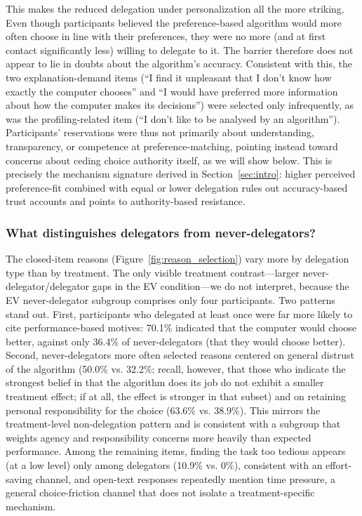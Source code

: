 \documentclass[a4paper, 12pt, fleqn]{article}
\theoremstyle{definition}
\begin{document}
This makes the reduced delegation under personalization all the more striking. Even though participants believed the preference-based algorithm would more often choose in line with their preferences, they were no more (and at first contact significantly less) willing to delegate to it. The barrier therefore does not appear to lie in doubts about the algorithm's accuracy. Consistent with this, the two explanation-demand items (``I find it unpleasant that I don't know how exactly the computer chooses'' and ``I would have preferred more information about how the computer makes its decisions'') were selected only infrequently, as was the profiling-related item (``I don't like to be analysed by an algorithm''). Participants' reservations were thus not primarily about understanding, transparency, or competence at preference-matching, pointing instead toward concerns about ceding choice authority itself, as we will show below. This is precisely the mechanism signature derived in Section~\ref{sec:intro}: higher perceived preference-fit combined with equal or lower delegation rules out accuracy-based trust accounts and points to authority-based resistance.

\subsubsection*{What distinguishes delegators from never-delegators?}
The closed-item reasons (Figure~\ref{fig:reason_selection}) vary more by delegation type than by treatment. The only visible treatment contrast---larger never-delegator/delegator gaps in the EV condition---we do not interpret, because the EV never-delegator subgroup comprises only four participants. Two patterns stand out. First, participants who delegated at least once were far more likely to cite performance-based motives: 70.1\% indicated that the computer would choose better, against only 36.4\% of never-delegators (that they would choose better). Second, never-delegators more often selected reasons centered on general distrust of the algorithm (50.0\% vs. 32.2\%; recall, however, that those who indicate the strongest belief in that the algorithm does its job do not exhibit a smaller treatment effect; if at all, the effect is stronger in that subset) and on retaining personal responsibility for the choice (63.6\% vs. 38.9\%). This mirrors the treatment-level non-delegation pattern and is consistent with a subgroup that weights agency and responsibility concerns more heavily than expected performance. Among the remaining items, finding the task too tedious appears (at a low level) only among delegators (10.9\% vs. 0\%), consistent with an effort-saving channel, and open-text responses repeatedly mention time pressure, a general choice-friction channel that does not isolate a treatment-specific mechanism.
\end{document}
